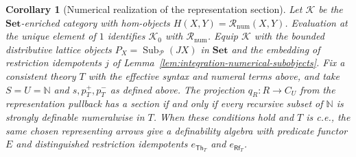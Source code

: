 \documentclass[11pt]{article}
\newtheorem{corollary}[theorem]{Corollary}
\theoremstyle{definition}
\theoremstyle{remark}
\begin{document}
\begin{corollary}[Numerical realization of the representation section]
\label{cor:numerical-definability-algebras}
Let $\mathcal K$ be the $\mathbf{Set}$-enriched category with
hom-objects $H(X,Y)=\mathcal R_{\mathrm{num}}(X,Y)$. Evaluation at
the unique element of $1$ identifies $\mathcal K_0$ with
$\mathcal R_{\mathrm{num}}$. Equip $\mathcal K$ with
the bounded distributive lattice objects
$P_X=\operatorname{Sub}_{\mathcal P}(JX)$ in $\mathbf{Set}$ and
the embedding of restriction idempotents $j$ of
Lemma~\ref{lem:integration-numerical-subobjects}.
Fix a consistent theory $T$ with the effective syntax and numeral
terms above, and take $S=U=\mathbb N$ and
$s,p_T^+,p_T^-$ as defined above.
The projection $q_R:R\to C_U$ from the representation pullback
has a section if and only if every recursive subset of
$\mathbb N$ is strongly definable numeralwise in $T$.
When these conditions hold and $T$ is c.e., the same chosen
representing arrows give a definability algebra with predicate
functor $E$ and distinguished restriction idempotents
$e_{\mathsf{Th}_T}$ and $e_{\mathsf{Rf}_T}$.
\end{corollary}
\end{document}
